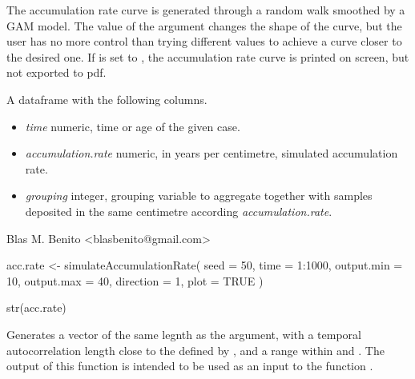 \documentclass[letterpaper]{book}
\begin{document}
%
\begin{Details}\relax
The accumulation rate curve is generated through a random walk smoothed by a GAM model. The value of the  argument changes the shape of the curve, but the user has no more control than trying different values to achieve a curve closer to the desired one. If  is set to , the accumulation rate curve is printed on screen, but not exported to pdf.
\end{Details}
%
\begin{Value}
A dataframe with the following columns.
\begin{itemize}

\item \emph{time} numeric, time or age of the given case.
\item \emph{accumulation.rate} numeric, in years per centimetre, simulated accumulation rate.
\item \emph{grouping} integer, grouping variable to aggregate together with  samples deposited in the same centimetre according \emph{accumulation.rate}.

\end{itemize}

\end{Value}
%
\begin{Author}\relax
Blas M. Benito  <blasbenito@gmail.com>
\end{Author}
%
\begin{SeeAlso}\relax
{}
\end{SeeAlso}
%
\begin{Examples}
\begin{ExampleCode}

acc.rate <- simulateAccumulationRate(
 seed = 50,
 time = 1:1000,
 output.min = 10,
 output.max = 40,
 direction = 1,
 plot = TRUE
 )

str(acc.rate)

\end{ExampleCode}
\end{Examples}
%
\begin{Description}\relax
Generates a vector of the same legnth as the  argument, with a temporal autocorrelation length close to the defined by , and a range within  and . The output of this function is intended to be used as an input to the function .
\end{Description}
\end{document}
